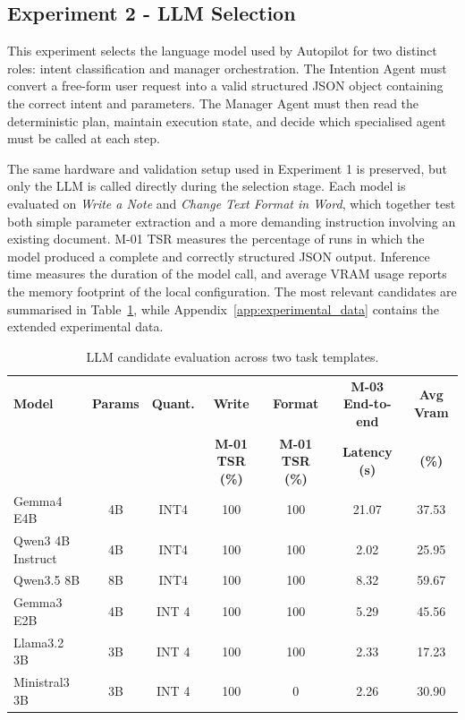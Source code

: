 \subsection{Experiment 2 - LLM Selection}
\label{sec:llm_selection}
This experiment selects the language model used by Autopilot for two distinct roles: intent classification and manager orchestration. The Intention Agent must convert a free-form user request into a valid structured JSON object containing the correct intent and parameters. The Manager Agent must then read the deterministic plan, maintain execution state, and decide which specialised agent must be called at each step.

The same hardware and validation setup used in Experiment 1 is preserved, but only the LLM is called directly during the selection stage. Each model is evaluated on \textit{Write a Note} and \textit{Change Text Format in Word}, which together test both simple parameter extraction and a more demanding instruction involving an existing document. M-01 TSR measures the percentage of runs in which the model produced a complete and correctly structured JSON output. Inference time measures the duration of the model call, and average VRAM usage reports the memory footprint of the local configuration. The most relevant candidates are summarised in Table~\ref{tab:llm_candidates}, while Appendix~\ref{app:experimental_data} contains the extended experimental data.

\begin{table}[H]
\centering
\footnotesize
\setlength{\tabcolsep}{4pt}
\begin{tabularx}{\textwidth}{|X|c|c|c|c|c|c|}
\hline
\textbf{Model} & \textbf{Params} & \textbf{Quant.} & \textbf{Write} & \textbf{Format} & \textbf{M-03 End-to-end} & \textbf{Avg Vram} \\
 & & & \textbf{M-01 TSR (\%)} & \textbf{M-01 TSR (\%)} & \textbf{Latency (s)} & \textbf{(\%)} \\
\hline
Gemma4 E4B         & 4B & INT4  & 100 & 100 & 21.07 & 37.53 \\
\hline
Qwen3 4B Instruct  & 4B & INT4  & 100 & 100 &  2.02 & 25.95 \\
\hline
Qwen3.5 8B         & 8B & INT4  & 100 & 100 &  8.32 & 59.67 \\
\hline
Gemma3 E2B         & 4B & INT 4 & 100 & 100 &  5.29 & 45.56 \\
\hline
Llama3.2 3B        & 3B & INT 4 & 100 & 100 &  2.33 & 17.23 \\
\hline
Ministral3 3B      & 3B & INT 4 & 100 &   0 &  2.26 & 30.90 \\
\hline
\end{tabularx}
\caption{LLM candidate evaluation across two task templates.}
\label{tab:llm_candidates}
\end{table}

